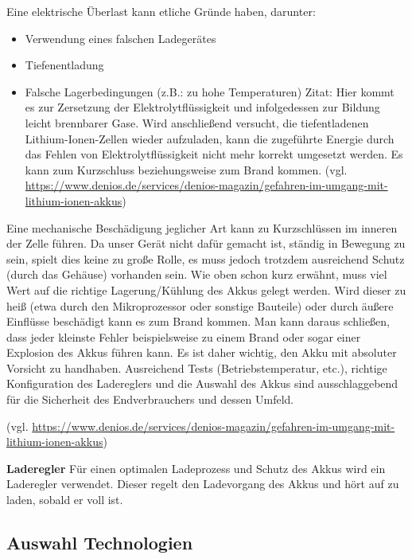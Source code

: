 \documentclass[]{article}
\begin{document}
Eine elektrische Überlast kann etliche Gründe haben, darunter: 
\begin{itemize}
	\item Verwendung eines falschen Ladegerätes
	\item Tiefenentladung
	\item Falsche Lagerbedingungen (z.B.: zu hohe Temperaturen) 
\newline
Zitat: \glqq Hier kommt es zur Zersetzung der Elektrolytflüssigkeit und infolgedessen zur Bildung leicht brennbarer Gase. Wird anschließend versucht, die tiefentladenen Lithium-Ionen-Zellen wieder aufzuladen, kann die zugeführte Energie durch das Fehlen von Elektrolytflüssigkeit nicht mehr korrekt umgesetzt werden. Es kann zum Kurzschluss beziehungsweise zum Brand kommen.\grqq{} (vgl. \url{https://www.denios.de/services/denios-magazin/gefahren-im-umgang-mit-lithium-ionen-akkus})
\end{itemize}
Eine mechanische Beschädigung jeglicher Art kann zu Kurzschlüssen im inneren der Zelle führen. Da unser Gerät nicht dafür gemacht ist, ständig in Bewegung zu sein, spielt dies keine zu große Rolle, es muss jedoch trotzdem ausreichend Schutz (durch das Gehäuse) vorhanden sein.
\vspace{4mm}\newline
Wie oben schon kurz erwähnt, muss viel Wert auf die richtige Lagerung/Kühlung des Akkus gelegt werden. Wird dieser zu heiß (etwa durch den Mikroprozessor oder sonstige Bauteile) oder durch äußere Einflüsse beschädigt kann es zum Brand kommen.
\vspace{4mm}\newline
Man kann daraus schließen, dass jeder kleinste Fehler beispielsweise zu einem Brand oder sogar einer Explosion des Akkus führen kann. Es ist daher wichtig, den Akku mit absoluter Vorsicht zu handhaben. Ausreichend Tests (Betriebstemperatur, etc.), richtige Konfiguration des Ladereglers und die Auswahl des Akkus sind ausschlaggebend für die Sicherheit des Endverbrauchers und dessen Umfeld.

(vgl. \url{https://www.denios.de/services/denios-magazin/gefahren-im-umgang-mit-lithium-ionen-akkus})

\textbf{Laderegler}\newline
Für einen optimalen Ladeprozess und Schutz des Akkus wird ein Laderegler verwendet. Dieser regelt den Ladevorgang des Akkus und hört auf zu laden, sobald er voll ist.

\subsection{Auswahl Technologien}
\end{document}
